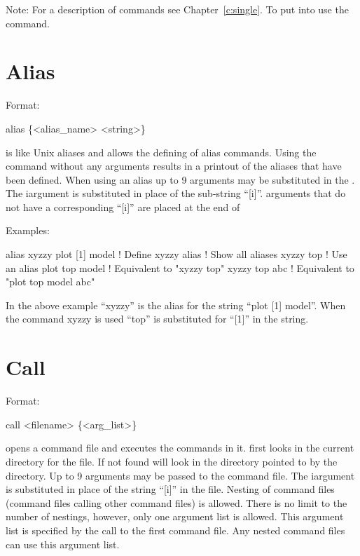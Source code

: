 
Note: For a description of  commands see
Chapter~\ref{c:single}. To put \tao into  use the
 command. 

\vfil
\break

\section{Alias}
\label{s:alias}

Format: 
\begin{example}
  alias \{<alias_name> <string>\}
\end{example}

\vskip 0.2in

 is like Unix aliases and allows the defining of alias
commands. Using the  command without any arguments results
in a printout of the aliases that have been defined. When using an
alias up to 9 arguments may be substituted in the . The
i\Th argument is substituted in place of the sub-string ``[i]''.
arguments that do not have a corresponding ``[i]'' are placed at the end
of 

Examples:
\begin{example}
    alias xyzzy plot [1] model  ! Define xyzzy
    alias                       ! Show all aliases
    xyzzy top                   ! Use an alias
    plot top model              ! Equivalent to "xyzzy top"
    xyzzy top abc               ! Equivalent to "plot top model abc"
\end{example}
In the above example ``xyzzy'' is the alias for the string ``plot [1]
model''.  When the command xyzzy is used ``top'' is substituted
for ``[1]'' in the string.

\section{Call}
\label{s:call}

Format: 
\begin{example}
  call <filename> \{<arg_list>\}  \Strut
\end{example}

\vskip 0.2in 
 opens a command file and executes the commands
in it.  \tao first looks in the current directory for the file. If not
found \tao will look in the directory pointed to by the
 directory.  Up to 9 arguments may be passed to
the command file. The i\Th argument is substituted in place of the
string ``[i]'' in the file. Nesting of command files (command files
calling other command files) is allowed. There is no limit to the
number of nestings, however, only one argument list is allowed. This
argument list is specified by the call to the first command file. Any
nested command files can use this argument list.

